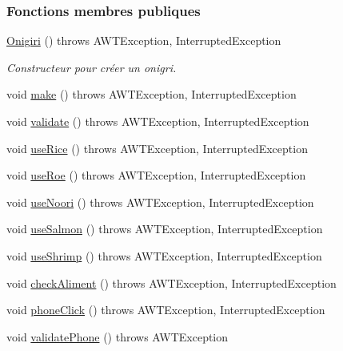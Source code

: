 \subsubsection*{Fonctions membres publiques}
\begin{DoxyCompactItemize}
\item 
\hyperlink{classTestSushi_1_1src_1_1Suchi_1_1Onigiri_a4f279ca850ccceb05576b8006ea303b6}{Onigiri} ()  throws A\+W\+T\+Exception, Interrupted\+Exception
\begin{DoxyCompactList}\small\item\em Constructeur pour créer un onigri. \end{DoxyCompactList}\item 
void \hyperlink{classTestSushi_1_1src_1_1Suchi_1_1Onigiri_a5ed4d63c69015a765597a58d83e7a8f5}{make} ()  throws A\+W\+T\+Exception, Interrupted\+Exception
\item 
void \hyperlink{classTestSushi_1_1src_1_1Suchi_1_1Onigiri_a65d8de2ad6a3deef9f409271bd7320ce}{validate} ()  throws A\+W\+T\+Exception, Interrupted\+Exception 
\item 
void \hyperlink{classTestSushi_1_1src_1_1Suchi_1_1Recette_a2d78a4575d1295e34210e2f77c01f3f3}{use\+Rice} ()  throws A\+W\+T\+Exception, Interrupted\+Exception
\item 
void \hyperlink{classTestSushi_1_1src_1_1Suchi_1_1Recette_a8967a205e78d02ef7c30fd435fbaa0af}{use\+Roe} ()  throws A\+W\+T\+Exception, Interrupted\+Exception
\item 
void \hyperlink{classTestSushi_1_1src_1_1Suchi_1_1Recette_a10bfe3c71750c84144203a7aa2c341ee}{use\+Noori} ()  throws A\+W\+T\+Exception, Interrupted\+Exception
\item 
void \hyperlink{classTestSushi_1_1src_1_1Suchi_1_1Recette_a87cd9338767df0e5db88e6005f1da984}{use\+Salmon} ()  throws A\+W\+T\+Exception, Interrupted\+Exception
\item 
void \hyperlink{classTestSushi_1_1src_1_1Suchi_1_1Recette_ab2c165554830ba84a392765621604d44}{use\+Shrimp} ()  throws A\+W\+T\+Exception, Interrupted\+Exception
\item 
void \hyperlink{classTestSushi_1_1src_1_1Suchi_1_1Recette_a83f9f5fb6bfe2691974a5e35386e7b8a}{check\+Aliment} ()  throws A\+W\+T\+Exception, Interrupted\+Exception
\item 
void \hyperlink{classTestSushi_1_1src_1_1Suchi_1_1Recette_ad94006ea131c2379a14c50eec870b69b}{phone\+Click} ()  throws A\+W\+T\+Exception, Interrupted\+Exception
\item 
void \hyperlink{classTestSushi_1_1src_1_1Suchi_1_1Recette_a33f0912e1212b01ea1b3787bed28f0fe}{validate\+Phone} ()  throws A\+W\+T\+Exception

\end{DoxyCompactItemize}
